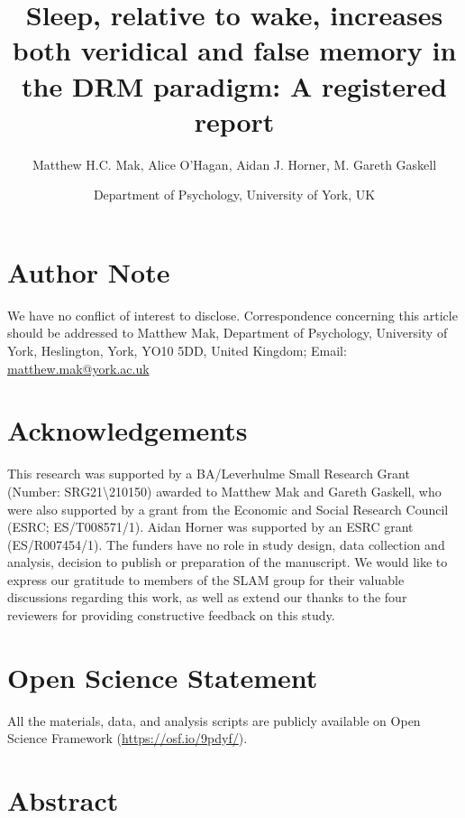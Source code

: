 \documentclass[
]{article}
\title{Sleep, relative to wake, increases both veridical and false memory in the DRM paradigm: A registered report}
\author{Matthew H.C. Mak, Alice O'Hagan, Aidan J. Horner, M. Gareth Gaskell}
\date{Department of Psychology, University of York, UK}
\begin{document}
\maketitle

\hypertarget{author-note}{%
\section*{Author Note}\label{author-note}}

We have no conflict of interest to disclose. Correspondence concerning this article should be addressed to Matthew Mak, Department of Psychology, University of York, Heslington, York, YO10 5DD, United Kingdom; Email: \url{matthew.mak@york.ac.uk}

\hypertarget{acknowledgements}{%
\section*{Acknowledgements}\label{acknowledgements}}

This research was supported by a BA/Leverhulme Small Research Grant (Number: SRG21\textbackslash210150) awarded to Matthew Mak and Gareth Gaskell, who were also supported by a grant from the Economic and Social Research Council (ESRC; ES/T008571/1). Aidan Horner was supported by an ESRC grant (ES/R007454/1). The funders have no role in study design, data collection and analysis, decision to publish or preparation of the manuscript. We would like to express our gratitude to members of the SLAM group for their valuable discussions regarding this work, as well as extend our thanks to the four reviewers for providing constructive feedback on this study.

\hypertarget{open-science-statement}{%
\section*{Open Science Statement}\label{open-science-statement}}

All the materials, data, and analysis scripts are publicly available on Open Science Framework (\url{https://osf.io/9pdyf/}).

\hypertarget{abstract}{%
\section*{Abstract}\label{abstract}}
\end{document}

